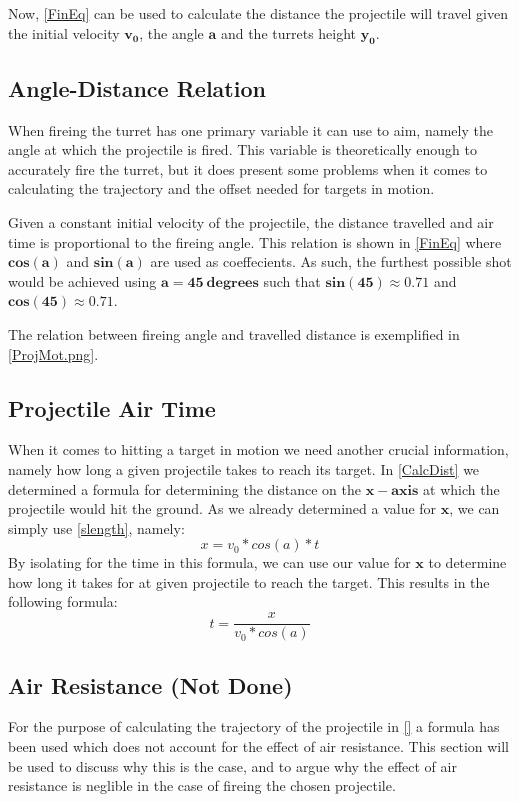Now, \autoref{FinEq} can be used to calculate the distance the projectile will
travel given the initial velocity $\mathbf{v_0}$, the angle $\mathbf{a}$ and
the turrets height $\mathbf{y_0}$.

\subsection{Angle-Distance Relation}
When fireing the turret has one primary variable it can use to aim,
namely the angle at which the projectile is fired. This variable is
theoretically enough to accurately fire the turret, but it does present some
problems when it comes to calculating the trajectory and the offset needed for
targets in motion.\nl

Given a constant initial velocity of the projectile, the distance travelled and
air time is proportional to the fireing angle. This relation is shown in
\autoref{FinEq} where $\mathbf{cos(a)}$ and $\mathbf{sin(a)}$ are used as
coeffecients. As such, the furthest possible shot would be achieved using
$\mathbf{a=45\ degrees}$ such that $\mathbf{sin(45)\approx 0.71}$ and
$\mathbf{cos(45)\approx 0.71}$.

The relation between fireing angle and travelled distance is exemplified in
\autoref{ProjMot.png}.


\subsection{Projectile Air Time}
When it comes to hitting a target in motion we need another crucial information,
namely how long a given projectile takes to reach its target.
In \autoref{CalcDist} we determined a formula for determining the distance on
the $\mathbf{x-axis}$ at which the projectile would hit the ground. As we
already determined a value for $\mathbf{x}$, we can simply use
\autoref{slength}, namely:
\begin{equation}
x=v_0*cos(a)*t
\end{equation}
By isolating for the time in this formula, we can use our value for $\mathbf{x}$
to determine how long it takes for at given projectile to reach the target. This
results in the following formula:
\begin{equation}\label{TimeEq}
t=\frac{x}{v_0*cos(a)}
\end{equation}

\subsection{Air Resistance (Not Done)}\label{AirResDisc}
For the purpose of calculating the trajectory of the projectile in \autoref{} a
formula has been used which does not account for the effect of air resistance.
This section will be used to discuss why this is the case, and to argue why the
effect of air resistance is neglible in the case of fireing the chosen
projectile.\nl

